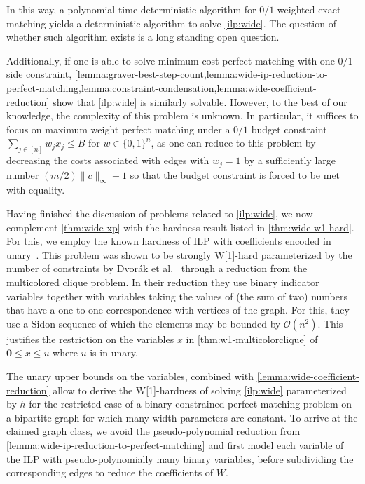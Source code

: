 \documentclass[a4paper,UKenglish,cleveref,thm-restate]{lipics-v2021}
\newcommand{\veczero}{\mathbf0}
\renewcommand{\O}{\mathcal O}
\begin{document}
In this way, a polynomial time deterministic algorithm for $0/1$-weighted exact matching yields a deterministic algorithm to solve \cref{ilp:wide}. The question of whether such algorithm exists is a long standing open question.

Additionally, if one is able to solve minimum cost perfect matching with one $0/1$ side constraint, \cref{lemma:graver-best-step-count,lemma:wide-ip-reduction-to-perfect-matching,lemma:constraint-condensation,lemma:wide-coefficient-reduction} show that \cref{ilp:wide} is similarly solvable. However, to the best of our knowledge, the complexity of this problem is unknown. In particular, it suffices to focus on maximum weight perfect matching under a $0/1$ budget constraint $\sum_{j\in[n]}w_jx_j\le B$ for $w\in\{0,1\}^n$, as one can reduce to this problem by decreasing the costs associated with edges with $w_j=1$ by a sufficiently large number $(m/2)\|c\|_\infty+1$ so that the budget constraint is forced to be met with equality.

Having finished the discussion of problems related to \cref{ilp:wide}, we now complement \cref{thm:wide-xp} with the hardness result listed in \cref{thm:wide-w1-hard}. For this, we employ the known hardness of ILP with coefficients encoded in unary~\cite{DBLP:journals/ai/DvorakEGKO21}. This problem was shown to be strongly W[1]-hard parameterized by the number of constraints by Dvorák et al.~\cite{DBLP:journals/ai/DvorakEGKO21} through a reduction from the multicolored clique problem. In their reduction they use binary indicator variables together with variables taking the values of (the sum of two) numbers that have a one-to-one correspondence with vertices of the graph. For this, they use a Sidon sequence of which the elements may be bounded by $\O(n^2)$. This justifies the restriction on the variables $x$ in \cref{thm:w1-multicolorclique} of $\veczero\le x\le u$ where $u$ is in unary.

\thmwonemulticolorclique*

The unary upper bounds on the variables, combined with \cref{lemma:wide-coefficient-reduction} allow to derive the W[1]-hardness of solving \cref{ilp:wide} parameterized by $h$ for the restricted case of a binary constrained perfect matching problem on a bipartite graph for which many width parameters are constant. To arrive at the claimed graph class, we avoid the pseudo-polynomial reduction from \cref{lemma:wide-ip-reduction-to-perfect-matching} and first model each variable of the ILP with pseudo-polynomially many binary variables, before subdividing the corresponding edges to reduce the coefficients of $W$.
\end{document}
